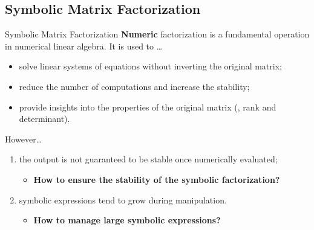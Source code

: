 \subsection{Symbolic Matrix Factorization}

\begin{frame}{Symbolic Matrix Factorization}
  \textbf{Numeric} factorization is a fundamental operation in numerical linear algebra. It is used to \dots
  \begin{itemize}
    \item solve linear systems of equations without inverting the original matrix;
    \item reduce the number of computations and increase the stability;
    \item provide insights into the properties of the original matrix (\ie{}, rank and determinant).
  \end{itemize}
  \vspace{1.0em}
  \vspace{1.0em}
  However\dots
  \begin{enumerate}
    \item the output is not guaranteed to be stable once numerically evaluated;
    \begin{itemize}
      \item[] \textbf{How to ensure the stability of the symbolic factorization?}
    \end{itemize}
    \item symbolic expressions tend to grow during manipulation.
    \begin{itemize}
      \item[] \textbf{How to manage large symbolic expressions?}
    \end{itemize}
  \end{enumerate}
\end{frame}

